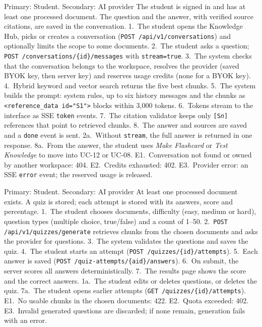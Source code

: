 {Primary: Student. Secondary: AI provider}
{The student is signed in and has at least one processed document.}
{The question and the answer, with verified source citations, are saved in the conversation.}
{1.~The student opens the Knowledge Hub, picks or creates a conversation
(\texttt{POST /api/v1/conversations}) and optionally limits the scope to some documents.
2.~The student asks a question; \texttt{POST /conversations/\{id\}/messages} with
\texttt{stream=true}. 3.~The system checks that the conversation belongs to the workspace,
resolves the provider (saved BYOK key, then server key) and reserves usage credits (none for a
BYOK key). 4.~Hybrid keyword and vector search returns the five best chunks. 5.~The system builds
the prompt: system rules, up to six history messages and the chunks as
\texttt{<reference\_data id="S1">} blocks within 3{,}000 tokens. 6.~Tokens stream to the
interface as SSE \texttt{token} events. 7.~The citation validator keeps only \texttt{[S\emph{n}]}
references that point to retrieved chunks. 8.~The answer and sources are saved and a
\texttt{done} event is sent.}
{2a.~Without \texttt{stream}, the full answer is returned in one response. 8a.~From the answer, the
student uses \emph{Make Flashcard} or \emph{Test Knowledge} to move into UC-12 or UC-08.}
{E1.~Conversation not found or owned by another workspace: 404. E2.~Credits exhausted: 402.
E3.~Provider error: an SSE \texttt{error} event; the reserved usage is released.}

{Primary: Student. Secondary: AI provider}
{At least one processed document exists.}
{A quiz is stored; each attempt is stored with its answers, score and percentage.}
{1.~The student chooses documents, difficulty (easy, medium or hard), question types
(multiple choice, true/false) and a count of 1--50. 2.~\texttt{POST /api/v1/quizzes/generate}
retrieves chunks from the chosen documents and asks the provider for questions. 3.~The system
validates the questions and saves the quiz. 4.~The student starts an attempt
(\texttt{POST /quizzes/\{id\}/attempts}). 5.~Each answer is saved
(\texttt{POST /quiz-attempts/\{aid\}/answers}). 6.~On submit, the server scores all answers
deterministically. 7.~The results page shows the score and the correct answers.}
{1a.~The student edits or deletes questions, or deletes the quiz. 7a.~The student opens earlier
attempts (\texttt{GET /quizzes/\{id\}/attempts}).}
{E1.~No usable chunks in the chosen documents: 422. E2.~Quota exceeded: 402. E3.~Invalid
generated questions are discarded; if none remain, generation fails with an error.}

